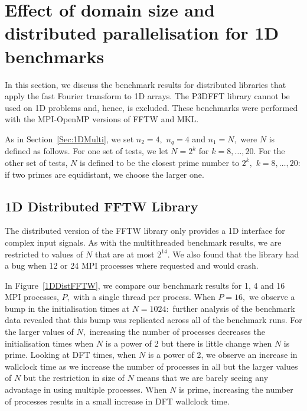 \documentclass[a4paper]{article}
\begin{document}
\clearpage

\section{Effect of domain size and distributed parallelisation for 1D benchmarks}\label{Sec:1DDistr}
In this section, we discuss the benchmark results for distributed
libraries that apply the fast Fourier transform to 1D arrays.  The
P3DFFT library cannot be used on 1D problems and, hence, is
excluded. These benchmarks were performed with the MPI-OpenMP versions
of FFTW and MKL. 

As in Section~\ref{Sec:1DMulti}, we set $n_2=4,$ $n_q=4$ and $n_1=N,$ were $N$ is
defined as follows.  For one set of tests, we let $N=2^k$ for
$k=8,\ldots,20.$ For the other set of tests, $N$ is defined to be the
closest prime number to $2^k,$ $k=8,\ldots,20:$ if two primes are
equidistant, we choose the larger one.

\subsection{1D Distributed FFTW Library}\label{Sec:1DDistFFTW}

The distributed version of the FFTW library only
provides a 1D interface for complex input signals. As with the
multithreaded benchmark results, we are restricted to values of $N$
that are at most $2^{14}.$ We also found that the library had a bug
when 12 or 24 MPI processes where requested and would crash.

In Figure~\ref{1DDistFFTW}, we compare our benchmark results for 1, 4
and 16 MPI processes, $P,$ with a single thread per process. When
$P=16,$ we observe a bump in the initialisation times at $N=1024:$
further analysis of the benchmark data revealed that this bump was
replicated across all of the benchmark runs. For the larger values of
$N,$ increasing the number of processes decreases the initialisation
times when $N$ is a power of 2 but there is little change when $N$ is
prime. Looking at DFT times, when $N$ is a power of 2, we observe an
increase in wallclock time as we increase the number of processes in
all but the larger values of $N$ but the restriction in size of $N$
means that we are barely seeing any advantage in using multiple
processes. When $N$ is prime, increasing the number of processes
results in a small increase in DFT wallclock time.
\end{document}
